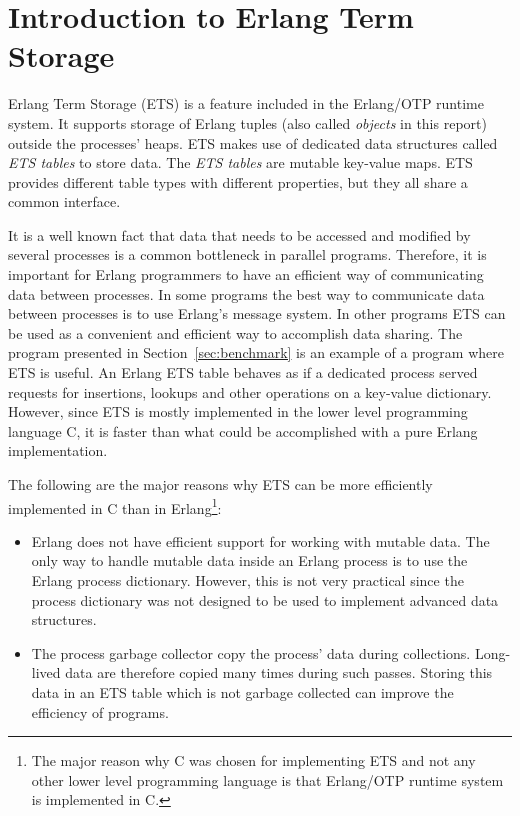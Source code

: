 \documentclass[aps,pre,preprint,nofootinbib]{revtex4}
\begin{document}
\section{Introduction to Erlang Term Storage}

Erlang Term Storage (ETS) is a feature included in the Erlang/OTP runtime system.
It supports storage of Erlang tuples (also called \emph{objects} in this report) outside the processes' heaps.
ETS makes use of dedicated data structures called \emph{ETS tables} to store data.
The \emph{ETS tables} are mutable key-value maps.
ETS provides different table types with different properties, but they all share a common interface.

It is a well known fact that data that needs to be accessed and modified by several processes is a common bottleneck in parallel programs.
Therefore, it is important for Erlang programmers to have an efficient way of communicating data between processes.
In some programs the best way to communicate data between processes is to use Erlang's message system.
In other programs ETS can be used as a convenient and efficient way to accomplish data sharing. 
The program presented in Section~\ref{sec:benchmark} is an example of a program where ETS is useful.
An Erlang ETS table behaves as if a dedicated process served requests for insertions, lookups and other operations on a key-value dictionary.
However, since ETS is mostly implemented in the lower level programming language C, it is faster than what could be accomplished with a pure Erlang implementation.

The following are the major reasons why ETS can be more efficiently implemented in C than in Erlang\footnote{The major reason why C was chosen for implementing ETS and not any other lower level programming language is that Erlang/OTP runtime system is implemented in C.}:
\begin{itemize}
\item
Erlang does not have efficient support for working with mutable data.
The only way to handle mutable data inside an Erlang process is to use the Erlang process dictionary.
However, this is not very practical since the process dictionary was not designed to be used to implement advanced data structures.
\item 
The process garbage collector copy the process' data during collections.
Long-lived data are therefore copied many times during such passes. 
Storing this data in an ETS table which is not garbage collected can improve the efficiency of programs.
\end{itemize}
\end{document}
